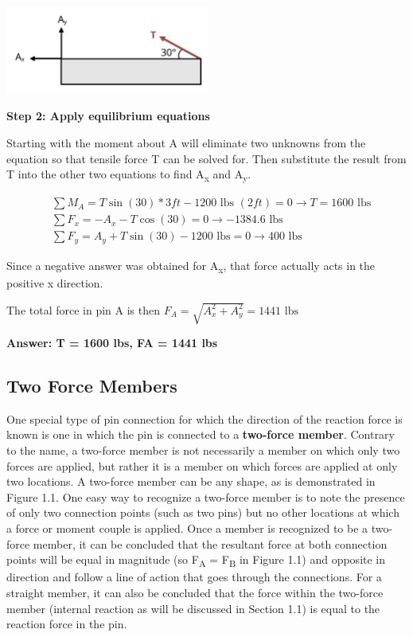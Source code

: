 \documentclass[
  letterpaper,
  DIV=11,
  numbers=noendperiod]{scrreprt}
\begin{document}
\begin{tcolorbox}
\begin{center}
\includegraphics[width=2.64583in,height=\textheight]{images/CH1 PNGs/example 1.1 part 2.png}
\end{center}

\textbf{Step 2: Apply equilibrium equations}

Starting with the moment about A will eliminate two unknowns from the
equation so that tensile force T can be solved for. Then substitute the
result from T into the other two equations to find A\textsubscript{x}
and A\textsubscript{y}.

\[
\begin{aligned}
& \sum M_A=T \sin (30) * 3 ft-1200\text{ lbs }(2 ft)=0 \rightarrow T=1600 \text{ lbs} \\
& \sum F_x=-A_x-T \cos (30)=0 \rightarrow-1384.6 \text{ lbs} \\
& \sum F_y=A_y+T \sin (30)-1200 \text{ lbs}=0 \rightarrow 400 \text{ lbs}
\end{aligned}
\]

Since a negative answer was obtained for A\textsubscript{x}, that force
actually acts in the positive x direction.

The total force in pin A is then
\(F_A=\sqrt{A_x^2+A_y^2}=1441 \text{ lbs}\)

\textbf{Answer: T = 1600 lbs, FA = 1441 lbs}

\end{tcolorbox}

\subsection{Two Force Members}\label{two-force-members}

One special type of pin connection for which the direction of the
reaction force is known is one in which the pin is connected to a
\textbf{two-force member}. Contrary to the name, a two-force member is
not necessarily a member on which only two forces are applied, but
rather it is a member on which forces are applied at only two locations.
A two-force member can be any shape, as is demonstrated in Figure 1.1.
One easy way to recognize a two-force member is to note the presence of
only two connection points (such as two pins) but no other locations at
which a force or moment couple is applied. Once a member is recognized
to be a two-force member, it can be concluded that the resultant force
at both connection points will be equal in magnitude (so
F\textsubscript{A} = F\textsubscript{B} in Figure 1.1) and opposite in
direction and follow a line of action that goes through the connections.
For a straight member, it can also be concluded that the force within
the two-force member (internal reaction as will be discussed in Section
1.1) is equal to the reaction force in the pin.
\end{document}
